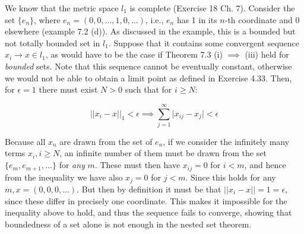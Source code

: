 \begin{solution}
    
    We know that the metric space $l_1$ is complete (Exercise 18 Ch. 7).
    Consider the set $\{e_n\}$, where $e_n = (0, 0, \ldots, 1, 0, \ldots)$, i.e., $e_n$ has 1 in its $n$-th coordinate and 0 elsewhere (example 7.2 (d)).
    As discussed in the example, this is a bounded but not totally bounded set in $l_1$.
    Suppose that it contains some convergent sequence $x_i \rightarrow x \in l_1$, as would have to be the case if Theorem 7.3 (i) $\implies$ (iii) held for \textit{bounded} sets.
    Note that this sequence cannot be eventually constant, otherwise we would not be able to obtain a limit point as defined in Exercise 4.33.
    Then, for $\epsilon = 1$ there must exist $N > 0$ such that for $i \geq N$:

    \[\lvert \lvert x_i - x \rvert \rvert _1 < \epsilon \implies \sum_{j=1}^{\infty} \lvert x_{ij} - x_j \rvert < \epsilon\]

    Because all $x_n$ are drawn from the set of $e_n$, if we consider the infinitely many terms $x_i, i \geq N$, an infinite number of them must be drawn from the set $\{e_m, e_{m + 1}, \ldots\}$ for \textit{any} $m$.
    These must then have $x_{ij} = 0$ for $i < m$, and hence from the inequality we have also $x_j = 0$ for $j < m$.
    Since this holds for any $m, x = (0, 0, 0, \ldots)$.
    But then by definition it must be that $\lvert \lvert x_i - x \rvert \rvert = 1 = \epsilon$, since these differ in precisely one coordinate.
    This makes it impossible for the inequality above to hold, and thus the sequence fails to converge, showing that boundedness of a set alone is not enough in the nested set theorem.
\end{solution}